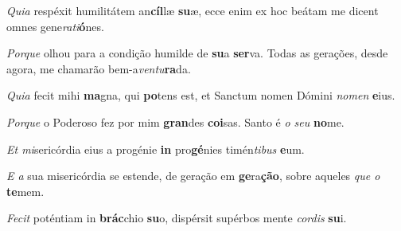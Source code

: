 \begin{greenumerate}
  \setcounter{enumi}{1}


  \item \textit{Quia} respéxit humilitátem an\textbf{cíl}læ \textbf{su}æ, {\GreStar} ecce enim ex hoc beátam me dicent omnes gene\textit{rati}\textbf{ó}nes. \\ 

  \switchcolumn\setcounter{enumi}{1}

  \item \textit{Porque} olhou para a condição humilde de \textbf{su}a \textbf{ser}va. {\GreStar} Todas as gerações, desde agora, me chamarão bem-a\textit{ventu}\-\textbf{ra}\-da. 

  \switchcolumn*


  \item \textit{Quia} fecit mihi \textbf{ma}gna, qui \textbf{po}tens est, {\GreStar} et Sanctum nomen Dómini \textit{nomen} \textbf{e}ius. 

  \switchcolumn%

  \item \textit{Porque} o Poderoso fez por mim \textbf{gran}des \textbf{coi}sas. {\GreStar} Santo é \textit{o seu} \textbf{no}me. 

  \switchcolumn*


  \item \textit{Et mi}sericórdia eius a progénie \textbf{in} pro\textbf{gé}nies {\GreStar} timén\textit{tibus} \textbf{e}um. 

  \switchcolumn%

  \item \textit{E a} sua misericórdia se estende, de geração em \textbf{ge}\-ra\-\textbf{ção}, {\GreStar} sobre aqueles \textit{que o} \textbf{te}mem. 

  \switchcolumn*


  \item \textit{Fecit} poténtiam in \textbf{brác}chio \textbf{su}o, {\GreStar} dispérsit supérbos mente \textit{cordis} \textbf{su}i. 

  \switchcolumn%


\end{greenumerate}
